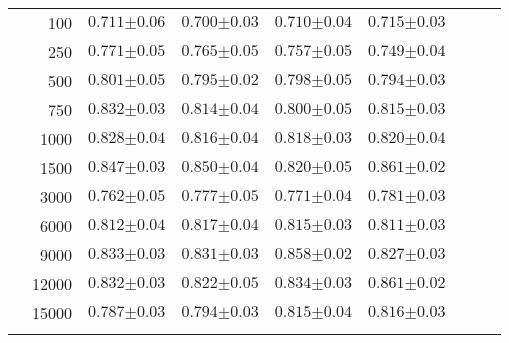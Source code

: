 \begin{table}[p]
\begin{tabularx}{0.65\textwidth}{cr| *{7}{Y}}
        & 100 & $0.711{\scriptscriptstyle\pm0.06}$ & $0.700{\scriptscriptstyle\pm0.03}$ & $0.710{\scriptscriptstyle\pm0.04}$ & $0.715{\scriptscriptstyle\pm0.03}$ \\
        & 250 & $0.771{\scriptscriptstyle\pm0.05}$ & $0.765{\scriptscriptstyle\pm0.05}$ & $0.757{\scriptscriptstyle\pm0.05}$ & $0.749{\scriptscriptstyle\pm0.04}$ \\
        & 500 & $0.801{\scriptscriptstyle\pm0.05}$ & $0.795{\scriptscriptstyle\pm0.02}$ & $0.798{\scriptscriptstyle\pm0.05}$ & $0.794{\scriptscriptstyle\pm0.03}$ \\
        & 750 & $0.832{\scriptscriptstyle\pm0.03}$ & $0.814{\scriptscriptstyle\pm0.04}$ & $0.800{\scriptscriptstyle\pm0.05}$ & $0.815{\scriptscriptstyle\pm0.03}$ \\
        & 1000 & $0.828{\scriptscriptstyle\pm0.04}$ & $0.816{\scriptscriptstyle\pm0.04}$ & $0.818{\scriptscriptstyle\pm0.03}$ & $0.820{\scriptscriptstyle\pm0.04}$ \\
        & 1500 & $0.847{\scriptscriptstyle\pm0.03}$ & $0.850{\scriptscriptstyle\pm0.04}$ & $0.820{\scriptscriptstyle\pm0.05}$ & $0.861{\scriptscriptstyle\pm0.02}$ \\
        & 3000 & $0.762{\scriptscriptstyle\pm0.05}$ & $0.777{\scriptscriptstyle\pm0.05}$ & $0.771{\scriptscriptstyle\pm0.04}$ & $0.781{\scriptscriptstyle\pm0.03}$ \\
        & 6000 & $0.812{\scriptscriptstyle\pm0.04}$ & $0.817{\scriptscriptstyle\pm0.04}$ & $0.815{\scriptscriptstyle\pm0.03}$ & $0.811{\scriptscriptstyle\pm0.03}$ \\
        & 9000 & $0.833{\scriptscriptstyle\pm0.03}$ & $0.831{\scriptscriptstyle\pm0.03}$ & $0.858{\scriptscriptstyle\pm0.02}$ & $0.827{\scriptscriptstyle\pm0.03}$ \\
        & 12000 & $0.832{\scriptscriptstyle\pm0.03}$ & $0.822{\scriptscriptstyle\pm0.05}$ & $0.834{\scriptscriptstyle\pm0.03}$ & $0.861{\scriptscriptstyle\pm0.02}$ \\
        & 15000 & $0.787{\scriptscriptstyle\pm0.03}$ & $0.794{\scriptscriptstyle\pm0.03}$ & $0.815{\scriptscriptstyle\pm0.04}$ & $0.816{\scriptscriptstyle\pm0.03}$ \\

    \end{tabularx}
\end{table}
